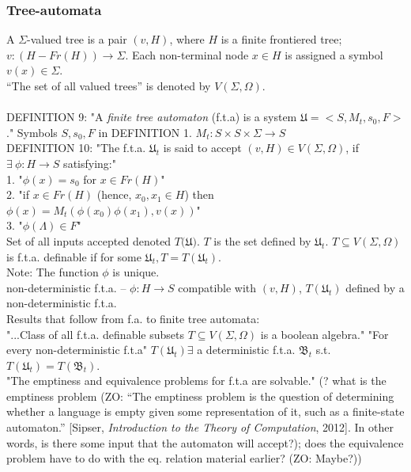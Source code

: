 \subsubsection{Tree-automata}
A $\Sigma$-valued tree is a pair $(v, H)$, where $H$ is a finite frontiered tree; $v: (H-Fr(H)) \to \Sigma$. Each non-terminal node $x \in H$ is assigned a symbol $v(x) \in \Sigma$.\\
``The set of all valued trees'' is denoted by $V(\Sigma, \Omega)$.\\
\\
DEFINITION 9: "A \textit{finite tree automaton} (f.t.a) is a system $\mathfrak{U} = < S,M_t, s_0, F >$." Symbols $S, s_0, F$ in DEFINITION 1.  $M_t : S \times S \times \Sigma \to S$\\
DEFINITION 10: "The f.t.a. $\mathfrak{U}_t$ is said to accept $(v, H) \in V(\Sigma, \Omega)$, if $\exists \ \phi : H \to S$ satisfying:"\\
1. "$\phi(x) = s_0$ for $x \in Fr(H)$"\\
2. "if $x \in Fr(H)$ (hence, $x_0, x_1 \in H$) then $\phi(x) = M_t (\phi(x_0) \phi(x_1), v(x))$"\\
3. "$\phi(\Lambda) \in F$"\\
Set of all inputs accepted denoted $T(\mathfrak{U)}$.  $T$ is the set defined by $\mathfrak{U}_t$.  $T \subseteq V(\Sigma, \Omega)$ is f.t.a. definable if for some $\mathfrak{U}_t, T = T(\mathfrak{U}_t)$.\\
Note: The function $\phi$ is unique.\\
non-deterministic f.t.a. -- $\phi : H \to S$ compatible with $(v,H)$, $T(\mathfrak{U}_t)$ defined by a non-deterministic f.t.a.\\
Results that follow from f.a. to finite tree automata:\\
"...Class of all f.t.a. definable subsets $T \subseteq V(\Sigma, \Omega)$ is a boolean algebra." 
"For every non-deterministic f.t.a" $T(\mathfrak{U}_t) \exists$ a deterministic f.t.a. $\mathfrak{B}_t$ s.t. $T(\mathfrak{U}_t) = T(\mathfrak{B}_t)$.\\
"The emptiness and equivalence problems for f.t.a are solvable." (? what is the emptiness problem (ZO: ``The emptiness problem is the question of determining whether a language is empty given some representation of it, such as a finite-state automaton.'' [Sipser, \emph{Introduction to the Theory of Computation}, 2012]. In other words, is there some input that the automaton will accept?); does the equivalence problem have to do with the eq. relation material earlier? (ZO: Maybe?))

